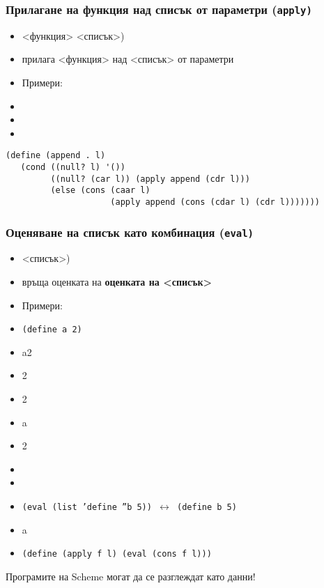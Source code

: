 \documentclass{beamer}
\begin{document}
\begin{frame}[fragile]
  \frametitle{Прилагане на функция над списък от параметри (\tt{apply})}

  \begin{itemize}[<+->]
  \item {}<функция> <списък>\tta)
  \item прилага <функция> над <списък> от параметри
  \item Примери:
  \item {}
  \item {}
  \item {}
  \end{itemize}

  \pause
\small
\begin{verbatim}
(define (append . l)
   (cond ((null? l) '())
         ((null? (car l)) (apply append (cdr l)))
         (else (cons (caar l)
                     (apply append (cons (cdar l) (cdr l)))))))
\end{verbatim}
\end{frame}

\begin{frame}
  \frametitle{Оценяване на списък като комбинация (\tt{eval})}

  \begin{itemize}[<+->]
  \item {}<списък>\tta)
  \item връща оценката на \textbf{оценката на <списък>}
  \item Примери:
  \item \tt{(define a 2)}
  \item \evalsto a2
  \item {}2
  \item {}2
  \item {}a
  \item {}2
  \item {}
  \item {}
  \item \tt{(eval (list 'define ''b 5))} $\longleftrightarrow$ \tt{(define b 5)}
  \item {\small {}a}
  \item \tt{(define (apply f l) (eval (cons f l)))}
  \end{itemize}

  \pause
  \alert{Програмите на Scheme могат да се разглеждат като данни!}
\end{frame}
\end{document}
